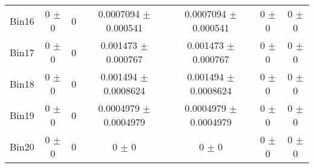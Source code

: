 \begin{tabular}{@{\extracolsep{4pt}}lcccccc@{}}
     Bin16 & 0 $\pm$ 0 & 0 & 0.0007094 $\pm$ 0.000541 & 0.0007094 $\pm$ 0.000541 & 0 $\pm$ 0 & 0 $\pm$ 0 \\ 
     Bin17 & 0 $\pm$ 0 & 0 & 0.001473 $\pm$ 0.000767 & 0.001473 $\pm$ 0.000767 & 0 $\pm$ 0 & 0 $\pm$ 0 \\ 
     Bin18 & 0 $\pm$ 0 & 0 & 0.001494 $\pm$ 0.0008624 & 0.001494 $\pm$ 0.0008624 & 0 $\pm$ 0 & 0 $\pm$ 0 \\ 
     Bin19 & 0 $\pm$ 0 & 0 & 0.0004979 $\pm$ 0.0004979 & 0.0004979 $\pm$ 0.0004979 & 0 $\pm$ 0 & 0 $\pm$ 0 \\ 
     Bin20 & 0 $\pm$ 0 & 0 & 0 $\pm$ 0 & 0 $\pm$ 0 & 0 $\pm$ 0 & 0 $\pm$ 0 \\ 
\hline\hline
  \end{tabular}
